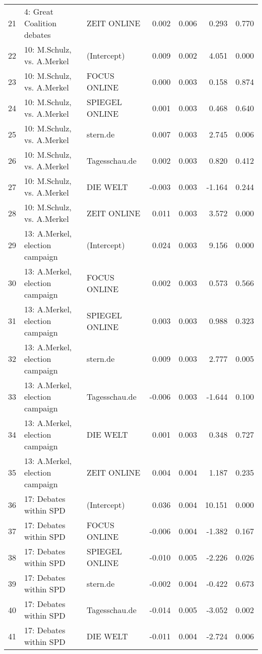 \begin{table}[ht]
\begin{tabular}{rllrrrr}
  21 & 4: Great Coalition debates & ZEIT ONLINE & 0.002 & 0.006 & 0.293 & 0.770 \\ 
  22 & 10: M.Schulz, vs. A.Merkel & (Intercept) & 0.009 & 0.002 & 4.051 & 0.000 \\ 
  23 & 10: M.Schulz, vs. A.Merkel & FOCUS ONLINE & 0.000 & 0.003 & 0.158 & 0.874 \\ 
  24 & 10: M.Schulz, vs. A.Merkel & SPIEGEL ONLINE & 0.001 & 0.003 & 0.468 & 0.640 \\ 
  25 & 10: M.Schulz, vs. A.Merkel & stern.de & 0.007 & 0.003 & 2.745 & 0.006 \\ 
  26 & 10: M.Schulz, vs. A.Merkel & Tagesschau.de & 0.002 & 0.003 & 0.820 & 0.412 \\ 
  27 & 10: M.Schulz, vs. A.Merkel & DIE WELT & -0.003 & 0.003 & -1.164 & 0.244 \\ 
  28 & 10: M.Schulz, vs. A.Merkel & ZEIT ONLINE & 0.011 & 0.003 & 3.572 & 0.000 \\ 
  29 & 13: A.Merkel, election campaign & (Intercept) & 0.024 & 0.003 & 9.156 & 0.000 \\ 
  30 & 13: A.Merkel, election campaign & FOCUS ONLINE & 0.002 & 0.003 & 0.573 & 0.566 \\ 
  31 & 13: A.Merkel, election campaign & SPIEGEL ONLINE & 0.003 & 0.003 & 0.988 & 0.323 \\ 
  32 & 13: A.Merkel, election campaign & stern.de & 0.009 & 0.003 & 2.777 & 0.005 \\ 
  33 & 13: A.Merkel, election campaign & Tagesschau.de & -0.006 & 0.003 & -1.644 & 0.100 \\ 
  34 & 13: A.Merkel, election campaign & DIE WELT & 0.001 & 0.003 & 0.348 & 0.727 \\ 
  35 & 13: A.Merkel, election campaign & ZEIT ONLINE & 0.004 & 0.004 & 1.187 & 0.235 \\ 
  36 & 17: Debates within SPD & (Intercept) & 0.036 & 0.004 & 10.151 & 0.000 \\ 
  37 & 17: Debates within SPD & FOCUS ONLINE & -0.006 & 0.004 & -1.382 & 0.167 \\ 
  38 & 17: Debates within SPD & SPIEGEL ONLINE & -0.010 & 0.005 & -2.226 & 0.026 \\ 
  39 & 17: Debates within SPD & stern.de & -0.002 & 0.004 & -0.422 & 0.673 \\ 
  40 & 17: Debates within SPD & Tagesschau.de & -0.014 & 0.005 & -3.052 & 0.002 \\ 
  41 & 17: Debates within SPD & DIE WELT & -0.011 & 0.004 & -2.724 & 0.006 \\ 

\end{tabular}
\end{table}
